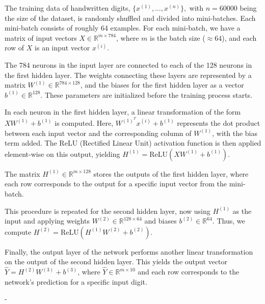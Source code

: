 The training data of handwritten digits, $\{x^{(1)},\ldots,x^{(n)}\},$ with $n=60000$ being the size of the dataset, is randomly shuffled and divided into mini-batches. Each mini-batch consists of roughly 64 examples. For each mini-batch, we have a matrix of input vectors $X \in \mathbb{R}^{m \times 784}$, where $m$ is the batch size ($\approx64$), and each row of $X$ is an input vector $x^{(i)}$.

The 784 neurons in the input layer are connected to each of the 128 neurons in the first hidden layer. The weights connecting these layers are represented by a matrix $W^{(1)} \in \mathbb{R}^{784 \times 128}$, and the biases for the first hidden layer as a vector $b^{(1)} \in \mathbb{R}^{128}$. These parameters are initialized before the training process starts.

In each neuron in the first hidden layer, a linear transformation of the form $XW^{(1)} + b^{(1)}$ is computed. Here, $W^{(1)^T}x^{(i)} + b^{(1)}$ represents the dot product between each input vector and the corresponding column of $W^{(1)}$, with the bias term added. The ReLU (Rectified Linear Unit) activation function is then applied element-wise on this output, yielding $H^{(1)} = \text{ReLU}(XW^{(1)} + b^{(1)})$.

The matrix $H^{(1)} \in \mathbb{R}^{m \times 128}$ stores the outputs of the first hidden layer, where each row corresponds to the output for a specific input vector from the mini-batch.

This procedure is repeated for the second hidden layer, now using $H^{(1)}$ as the input and applying weights $W^{(2)} \in \mathbb{R}^{128 \times 64}$ and biases $b^{(2)} \in \mathbb{R}^{64}$. Thus, we compute $H^{(2)} = \text{ReLU}(H^{(1)}W^{(2)} + b^{(2)})$.

Finally, the output layer of the network performs another linear transformation on the output of the second hidden layer. This yields the output vector $\hat{Y} = H^{(2)}W^{(3)} + b^{(3)}$, where $\hat{Y} \in \mathbb{R}^{m \times 10}$ and each row corresponds to the network's prediction for a specific input digit.














-